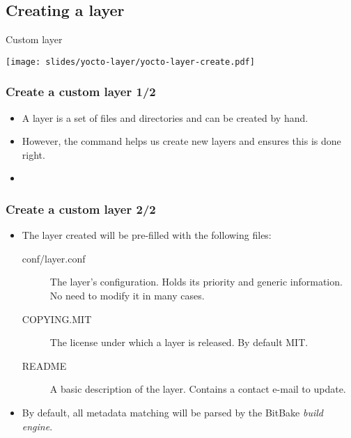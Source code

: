 \subsection{Creating a layer}

\begin{frame}{Custom layer}
  \begin{center}
    \texttt{[image: slides/yocto-layer/yocto-layer-create.pdf]}
  \end{center}
\end{frame}

\begin{frame}
  \frametitle{Create a custom layer 1/2}
  \begin{itemize}
    \item A layer is a set of files and directories and can be created
      by hand.
    \item However, the  command helps us create new
      layers and ensures this is done right.
    \item {}
  \end{itemize}
\end{frame}

\begin{frame}
  \frametitle{Create a custom layer 2/2}
  \begin{itemize}
    \item The layer created will be pre-filled with the following
          files:
    \begin{description}
      \item[conf/layer.conf] The layer's configuration. Holds its
        priority and generic information. No need to modify it in many
        cases.
      \item[COPYING.MIT] The license under which a layer is released.
        By default MIT.
      \item[README] A basic description of the layer. Contains a
        contact e-mail to update.
    \end{description}
    \item By default, all metadata matching 
          will be parsed by the BitBake \emph{build engine}.
  \end{itemize}
\end{frame}

